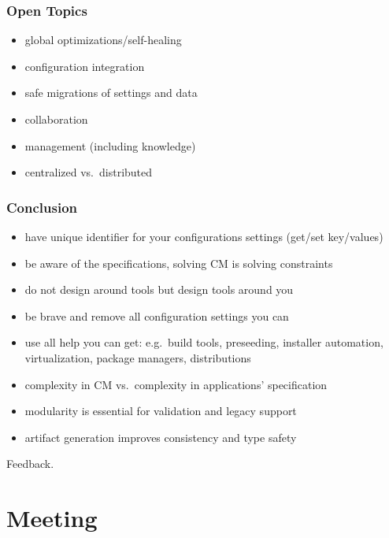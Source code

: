 \begin{frame}
	\frametitle{Open Topics}

	\begin{itemize}[<+-| alert@+>]
	\item global optimizations/self-healing
	\item configuration integration
	\item safe migrations of settings and data
	\item collaboration
	\item management (including knowledge)
	\item centralized vs.\ distributed
	\end{itemize}
\end{frame}


\begin{frame}
	\frametitle{Conclusion}

	\begin{itemize}[<+-| alert@+>]
	\item have unique identifier for your configurations settings (get/set key/values)
	\item be aware of the specifications, solving CM is solving constraints
	\item do not design around tools but design tools around you
	\item be brave and remove all configuration settings you can
	\item use all help you can get: e.g.\ build tools, preseeding, installer automation, virtualization, package managers, distributions
	\item complexity in CM vs.\ complexity in applications' specification
	\item modularity is essential for validation and legacy support
	\item artifact generation improves consistency and type safety
	\end{itemize}
\end{frame}

\begin{assignment}
	\begin{task}
	Feedback.
	\end{task}
\end{assignment}




\section{Meeting}

